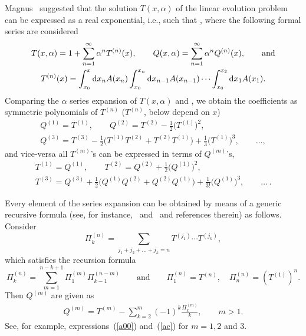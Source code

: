 \documentclass[10pt,a4paper]{amsart}
\numberwithin{equation}{section}
\theoremstyle{definition}
\def\mathcal#1{#1}%
\begin{document}
Magnus~\cite{Magnus} suggested that the solution $T(x, \alpha)$ of the linear evolution problem can
be expressed as a real exponential, i.e., \smash{$T(x, \alpha) = {\rm e}^{{\mathcal Q}(x,\alpha)}$} such that
\smash{${\rm e}^{{\mathcal Q}(x,\alpha)}: =1+\sum_{n=1}^{\infty} \frac{{\mathcal Q}^n(x,a)}{n!}$},
where the following formal series are considered
\begin{gather*}
T(x, \alpha) = 1+ \sum_{n =1}^{\infty} \alpha^n T^{(n)}(x), \qquad
{\mathcal Q}(x, \alpha) = \sum_{n=1}^{\infty}\alpha^n {\mathcal Q}^{(n)}(x), \qquad \text{and}
\\
T^{(n)}(x) = \int_{x_0}^x {\rm d}x_n A(x_n)
\int_{x_0}^{x_n }{\rm d}x_{n-1}A(x_{n-1}) \cdots \int_{x_0}^{x_2} {\rm d}x_{1} A(x_{1}). %
\end{gather*}
Comparing the $\alpha$ series expansion of $T(x, \alpha)$ and \smash{${\rm e}^{{\mathcal Q}(x, \alpha)}$}, we obtain the coefficients
\smash{${\mathcal Q}^{(n)}$} as symmetric polynomials of $T^{(n)}$ ($T^{(n)}$, \smash{${\mathcal Q}^{(n)}$} below depend on $x$)
\begin{gather}
 {\mathcal Q}^{(1)} = T^{(1)}, \qquad {\mathcal Q}^{(2)} = T^{(2)} -\frac{1}{2} \bigl(T^{(1)}\bigr)^2,\label{a00} \\
 {\mathcal Q}^{(3)} = T^{(3)} - \frac{1} {2} \bigl( T^{(1)} T^{(2)} + T^{(2)} T^{(1)}\bigr) +\frac{1}{3} \bigl(T^{(1)}\bigr)^3, \qquad\dots, \label{ac}
\end{gather}
and {vice-versa} all $T^{(m)}$'s can be expressed in terms of ${\mathcal Q}^{(m)}$'s,
\begin{gather}
T^{(1)} = {\mathcal Q}^{(1)} , \qquad T^{(2)} = {\mathcal Q}^{(2)} + \frac{1}{2} \bigl({\mathcal Q}^{(1)}\bigr)^2, \label{a}\\
T^{(3)} = {\mathcal Q}^{(3)} + \frac{1}{2} \bigl( {\mathcal Q}^{(1)} {\mathcal Q}^{(2)} +
 {\mathcal Q}^{(2)} {\mathcal Q}^{(1)}\bigr) +\frac{1}{3!} \bigl({\mathcal Q}^{(1)}\bigr)^3, \qquad \dots\,. \label{c}
\end{gather}

Every element \smash{${\mathcal Q}^{(m)}$} of the series expansion can be obtained
by means of a generic recursive formula (see, for instance,~\cite{Bur, Sal} and~\cite{review} and references therein) as follows.
Consider
\[
\Pi^{(n)}_k = \sum_{j_1+ j_2 + \dots+ j_k =n} T^{(j_1)} \cdots T^{(j_k)},
\]
which satisfies the recursion formula
\begin{equation}
\Pi^{(n)}_k = \sum_{m=1}^{n-k+1} \Pi^{(m)}_1 \Pi^{(n-m)}_{k-1} \qquad \mbox{and} \qquad
\Pi^{(n)}_1 = T^{(n)}, \quad \Pi^{(n)}_n = (T^{(1)})^n. \label{R2}
\end{equation}
Then ${\mathcal Q}^{(m)}$ are given as
\begin{gather}
{\mathcal Q}^{(m)} = T^{(m)} - \sum_{k=2}^m (-1)^k \frac{\Pi^{(m)}_k}{k}, \qquad m>1. \label{R1}
\end{gather}
See, for example, expressions~(\ref{a00}) and~(\ref{ac}) for $m=1, 2$ and $3$.
\end{document}
